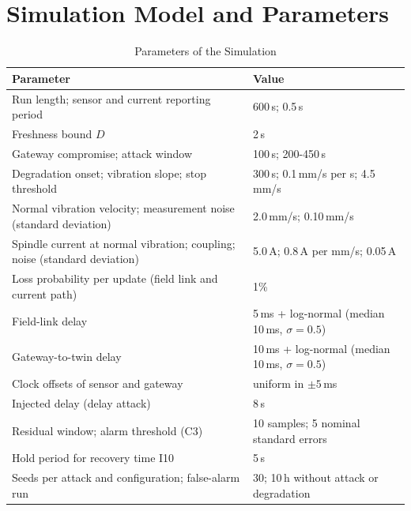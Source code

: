 \section{Simulation Model and Parameters}\label{app:sim}

\begin{table}[ht]
\caption{Parameters of the Simulation}\label{tab:simparams}
\scriptsize\setlength{\tabcolsep}{3pt}\renewcommand{\arraystretch}{1.08}
\begin{tabularx}{\columnwidth}{@{}YQ{3.3cm}@{}}
\toprule
Parameter & Value \\
\midrule
{}
Run length; sensor and current reporting period & 600\,s; 0.5\,s \\
Freshness bound $D$ & 2\,s \\
Gateway compromise; attack window & 100\,s; 200-450\,s \\
Degradation onset; vibration slope; stop threshold & 300\,s; 0.1\,mm/s per s; 4.5\,mm/s \\
Normal vibration velocity; measurement noise (standard deviation) & 2.0\,mm/s; 0.10\,mm/s \\
Spindle current at normal vibration; coupling; noise (standard deviation) & 5.0\,A; 0.8\,A per mm/s; 0.05\,A \\
Loss probability per update (field link and current path) & 1\% \\
Field-link delay & 5\,ms + log-normal (median 10\,ms, $\sigma = 0.5$) \\
Gateway-to-twin delay & 10\,ms + log-normal (median 10\,ms, $\sigma = 0.5$) \\
Clock offsets of sensor and gateway & uniform in $\pm 5$\,ms \\
Injected delay (delay attack) & 8\,s \\
Residual window; alarm threshold (C3) & 10 samples; 5 nominal standard errors \\
Hold period for recovery time I10 & 5\,s \\
Seeds per attack and configuration; false-alarm run & 30; 10\,h without attack or degradation \\
\bottomrule
\end{tabularx}
\end{table}



